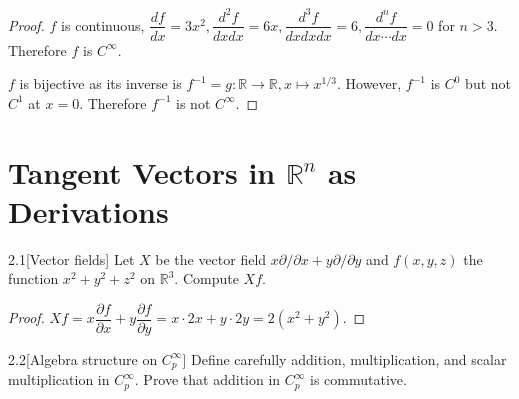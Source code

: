 \begin{proof}
	\( f \) is continuous, \( \dfrac{df}{dx} = 3x^{2}, \dfrac{d^{2}f}{dxdx} = 6x, \dfrac{d^{3}f}{dxdxdx} = 6, \dfrac{d^{n}f}{dx\cdots dx} = 0 \) for \( n > 3 \). Therefore \( f \) is \( C^{\infty} \).

	\( f \) is bijective as its inverse is \( f^{-1} = g: \mathbb{R} \to \mathbb{R}, x \mapsto x^{1/3} \). However, \( f^{-1} \) is \( C^{0} \) but not \( C^{1} \) at \( x = 0 \). Therefore \( f^{-1} \) is not \( C^{\infty} \).
\end{proof}

\section{Tangent Vectors in \( \mathbb{R}^{n} \) as Derivations}

\begin{problem}{2.1}[Vector fields]
Let \( X \) be the vector field \( x \partial/\partial x + y\partial/\partial y \) and \( f(x, y, z) \) the function \( x^{2} + y^{2} + z^{2} \) on \( \mathbb{R}^{3} \). Compute \( Xf \).
\end{problem}

\begin{proof}
	\( Xf = x\dfrac{\partial f}{\partial x} + y\dfrac{\partial f}{\partial y} = x\cdot 2x + y\cdot 2y = 2(x^{2} + y^{2}) \).
\end{proof}

\begin{problem}{2.2}[Algebra structure on \( C^{\infty}_{p} \)]
Define carefully addition, multiplication, and scalar multiplication in \( C^{\infty}_{p} \). Prove that addition in \( C^{\infty}_{p} \) is commutative.
\end{problem}

